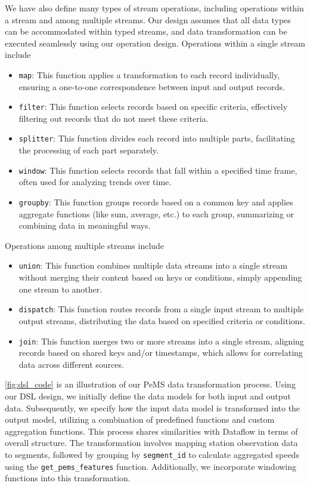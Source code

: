 We have also define many types of stream operations, including operations within a stream and among multiple streams. Our design assumes that all data types can be accommodated within typed streams, and data transformation can be executed seamlessly using our operation design. Operations within a single stream include 
\begin{itemize}
    \item {\tt map}: This function applies a transformation to each record individually, ensuring a one-to-one correspondence between input and output records.
    \item {\tt filter}: This function selects records based on specific criteria, effectively filtering out records that do not meet these criteria.
    \item {\tt splitter}: This function divides each record into multiple parts, facilitating the processing of each part separately.
    \item {\tt window}: This function selects records that fall within a specified time frame, often used for analyzing trends over time.
    \item {\tt groupby}: This function groups records based on a common key and applies aggregate functions (like sum, average, etc.) to each group, summarizing or combining data in meaningful ways.
\end{itemize}
Operations among multiple streams include 
\begin{itemize}
    \item {\tt union}: This function combines multiple data streams into a single stream without merging their content based on keys or conditions, simply appending one stream to another.
    \item {\tt dispatch}: This function routes records from a single input stream to multiple output streams, distributing the data based on specified criteria or conditions.
    \item {\tt join}: This function merges two or more streams into a single stream, aligning records based on shared keys and/or timestamps, which allows for correlating data across different sources.
\end{itemize}

\autoref{fig:dsl_code} is an illustration of our PeMS data transformation process. Using our DSL design, we initially define the data models for both input and output data. Subsequently, we specify how the input data model is transformed into the output model, utilizing a combination of predefined functions and custom aggregation functions. This process shares similarities with Dataflow in terms of overall structure. The transformation involves mapping station observation data to segments, followed by grouping by {\tt segment\_id} to calculate aggregated speeds using the {\tt get\_pems\_features} function. Additionally, we incorporate windowing functions into this transformation.

